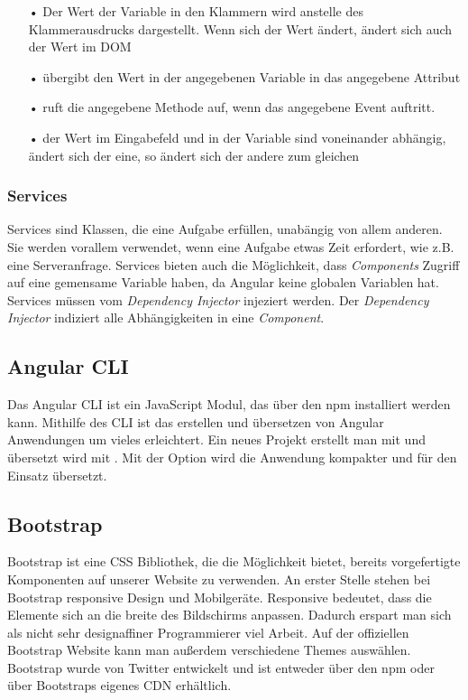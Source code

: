 \begin{itemize}
\item[•]  Der Wert der Variable in den Klammern wird anstelle des Klammerausdrucks dargestellt. Wenn sich der Wert ändert, ändert sich auch der Wert im \ac{DOM}
\item[•]  übergibt den Wert in der angegebenen Variable in das angegebene Attribut
\item[•]  ruft die angegebene Methode auf, wenn das angegebene Event auftritt.
\item[•]  der Wert im Eingabefeld und in der Variable sind voneinander abhängig, ändert sich der eine, so ändert sich der andere zum gleichen
\end{itemize}

\subsubsection{Services}
\label{sec:ang-services}
Services sind Klassen, die eine Aufgabe erfüllen, unabängig von allem anderen. Sie werden vorallem verwendet, wenn eine Aufgabe etwas Zeit erfordert, wie z.B. eine Serveranfrage. Services bieten auch die Möglichkeit, dass \textit{Components} Zugriff auf eine gemensame Variable haben, da Angular keine globalen Variablen hat. Services müssen vom \textit{Dependency Injector} injeziert werden. Der \textit{Dependency Injector} indiziert alle Abhängigkeiten in eine \textit{Component}.

\subsection{Angular CLI}
\label{sec:vor-angular-cli}
Das Angular \ac{CLI} ist ein JavaScript Modul, das über den \ac{npm} installiert werden kann. Mithilfe des \ac{CLI} ist das erstellen und übersetzen von Angular Anwendungen um vieles erleichtert. Ein neues Projekt erstellt man mit  und übersetzt wird mit . Mit der Option  wird die Anwendung kompakter und für den Einsatz übersetzt.

\subsection{Bootstrap}
\label{sec:vor-bootstrap}
Bootstrap ist eine CSS Bibliothek, die die Möglichkeit bietet, bereits vorgefertigte Komponenten auf unserer Website zu verwenden. An erster Stelle stehen bei Bootstrap responsive Design und Mobilgeräte. Responsive bedeutet, dass die Elemente sich an die breite des Bildschirms anpassen. Dadurch erspart man sich als nicht sehr designaffiner Programmierer viel Arbeit. Auf der offiziellen Bootstrap Website kann man außerdem verschiedene Themes auswählen. Bootstrap wurde von Twitter entwickelt und ist entweder über den \ac{npm} oder über Bootstraps eigenes \ac{CDN} erhältlich.

